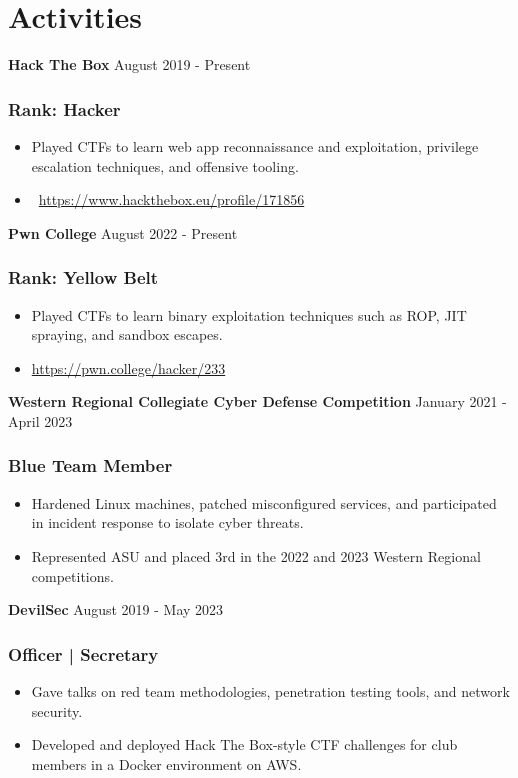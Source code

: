 \documentclass{article}
\newcommand{\resumesubsection}[2]{
  \noindent \textbf{#1} \hfill #2
}
\begin{document}
\section{Activities}

\resumesubsection{Hack The Box}{August 2019 - Present}
\subsubsection{Rank: Hacker}
\begin{itemize}
  \item Played CTFs to learn web app reconnaissance and exploitation, privilege escalation techniques, and offensive tooling.
  \item \faCube \ \url{https://www.hackthebox.eu/profile/171856}{}
\end{itemize}

\resumesubsection{Pwn College}{August 2022 - Present}
\subsubsection{Rank: Yellow Belt}
\begin{itemize}
  \item Played CTFs to learn binary exploitation techniques such as ROP, JIT spraying, and sandbox escapes.
  \item \url{https://pwn.college/hacker/233}
\end{itemize}

\resumesubsection{Western Regional Collegiate Cyber Defense Competition}{January 2021 - April 2023}
\subsubsection{Blue Team Member}
\begin{itemize}
  \item Hardened Linux machines, patched misconfigured services, and participated in incident response to isolate cyber threats.
  \item Represented ASU and placed 3rd in the 2022 and 2023 Western Regional competitions.
\end{itemize}

\resumesubsection{DevilSec}{August 2019 - May 2023}
\subsubsection{Officer | Secretary}
\begin{itemize} 
  \item Gave talks on red team methodologies, penetration testing tools, and network security.
  \item Developed and deployed Hack The Box-style CTF challenges for club members in a Docker environment on AWS.
\end{itemize}
\end{document}
